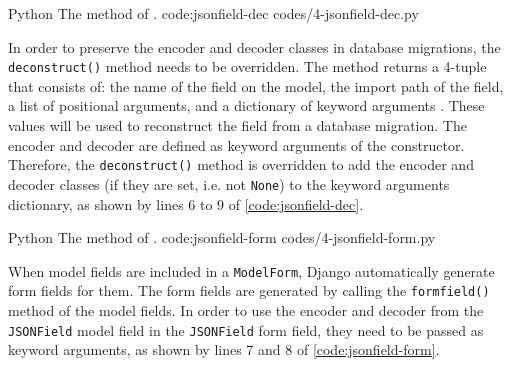 \listing
{Python}
{The  method of .}
{code:jsonfield-dec}
{codes/4-jsonfield-dec.py}

In order to preserve the encoder and decoder classes in database migrations,
the \verb|deconstruct()| method needs to be overridden. The method returns a
4-tuple that consists of: the name of the field on the model, the import path
of the field, a list of positional arguments, and a dictionary of keyword
arguments \cite{django:model_fields}. These values will be used to reconstruct
the field from a database migration. The encoder and decoder are defined as
keyword arguments of the constructor. Therefore, the \verb|deconstruct()|
method is overridden to add the encoder and decoder classes (if they are set,
i.e. not \verb|None|) to the keyword arguments dictionary, as shown by lines 6
to 9 of \autoref{code:jsonfield-dec}.

\listing
{Python}
{The  method of .}
{code:jsonfield-form}
{codes/4-jsonfield-form.py}

When model fields are included in a \verb|ModelForm|, Django automatically
generate form fields for them. The form fields are generated by calling the
\verb|formfield()| method of the model fields. In order to use the encoder and
decoder from the \verb|JSONField| model field in the \verb|JSONField| form
field, they need to be passed as keyword arguments, as shown by lines 7 and 8
of \autoref{code:jsonfield-form}.
